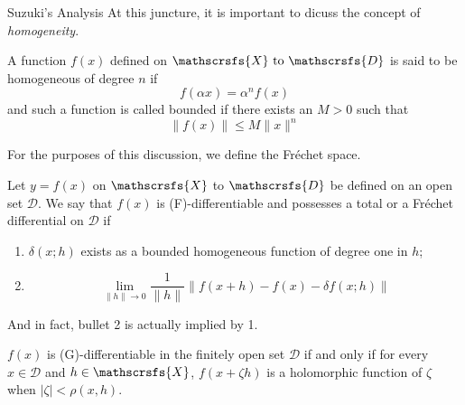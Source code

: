 \documentclass[aspectratio=169]{beamer}
\begin{document}
\begin{frame}[allowframebreaks]{Suzuki's Analysis}
		At this juncture, it is important to dicuss the concept of \textit{homogeneity}.
		\begin{definition}
			A function $f(x)$ defined on $\mathscrsfs{X}\text{ to }\mathscrsfs{D}$ is said to be homogeneous of degree $n$ if 
			\begin{equation}
				f(\alpha x)=\alpha^nf(x)
			\end{equation}
			and such a function is called bounded if there exists an $M>0$ such that
			\begin{equation}
				\|f(x)\|\leq M\|x\|^n
			\end{equation} 
		\end{definition}
		For the purposes of this discussion, we define the Fréchet space.
		\begin{definition}
			Let $y=f(x)$ on $\mathscrsfs{X}$ to $\mathscrsfs{D}$ be defined on an open set $\mathcal{D}$. We say that $f(x)$ is (F)-differentiable and possesses a total or a Fréchet differential on $\mathcal{D}$ if
			\begin{enumerate}
				\item $\delta(x;h)$ exists as a bounded homogeneous function of degree one in $h$;
				\item \begin{equation}
					\lim_{\|h\|\to0}\frac{1}{\|h\|}\|f(x+h)-f(x)-\delta f(x;h)\|
				\end{equation}
			\end{enumerate}
		\end{definition}
		And in fact, bullet 2 is actually implied by 1.
		\begin{theorem}
			$f(x)$ is (G)-differentiable in the finitely open set $\mathcal{D}$ if and only if for every $x\in\mathcal{D}$ and $h\in\mathscrsfs{X}$, $f(x+\zeta h)$ is a holomorphic function of $\zeta$ when $|\zeta|<\rho(x,h).$
		\end{theorem}
		

\end{frame}
\end{document}
